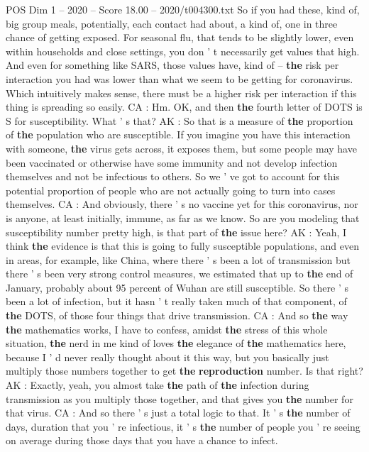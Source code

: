 \begin{textsample}{POS Dim 1 – 2020 – Score 18.00 – 2020/t004300.txt}
So if you had these, kind of, big group meals, potentially, each contact had about, a kind of, one in three chance of getting exposed.
For seasonal flu, that tends to be slightly lower, even within households and close settings, you don ' t necessarily get values that high.
And even for something like SARS, those values have, kind of -- \textbf{the} risk per interaction you had was lower than what we seem to be getting for coronavirus.
Which intuitively makes sense, there must be a higher risk per interaction if this thing is spreading so easily.
CA : Hm.
OK, and then \textbf{the} fourth letter of DOTS is S for susceptibility.
What ' s that?
AK : So that is a measure of \textbf{the} proportion of \textbf{the} population who are susceptible.
If you imagine you have this interaction with someone, \textbf{the} virus gets across, it exposes them, but some people may have been vaccinated or otherwise have some immunity and not develop infection themselves and not be infectious to others.
So we ' ve got to account for this potential proportion of people who are not actually going to turn into cases themselves.
CA : And obviously, there ' s no vaccine yet for this coronavirus, nor is anyone, at least initially, immune, as far as we know.
So are you modeling that susceptibility number pretty high, is that part of \textbf{the} issue here?
AK : Yeah, I think \textbf{the} evidence is that this is going to fully susceptible populations, and even in areas, for example, like China, where there ' s been a lot of transmission but there ' s been very strong control measures, we estimated that up to \textbf{the} end of January, probably about 95 percent of Wuhan are still susceptible.
So there ' s been a lot of infection, but it hasn ' t really taken much of that component, of \textbf{the} DOTS, of those four things that drive transmission.
CA : And so \textbf{the} way \textbf{the} mathematics works, I have to confess, amidst \textbf{the} stress of this whole situation, \textbf{the} nerd in me kind of loves \textbf{the} elegance of \textbf{the} mathematics here, because I ' d never really thought about it this way, but you basically just multiply those numbers together to get \textbf{the} \textbf{reproduction} number.
Is that right?
AK : Exactly, yeah, you almost take \textbf{the} path of \textbf{the} infection during transmission as you multiply those together, and that gives you \textbf{the} number for that virus.
CA : And so there ' s just a total logic to that.
It ' s \textbf{the} number of days, duration that you ' re infectious, it ' s \textbf{the} number of people you ' re seeing on average during those days that you have a chance to infect.

\end{textsample}
